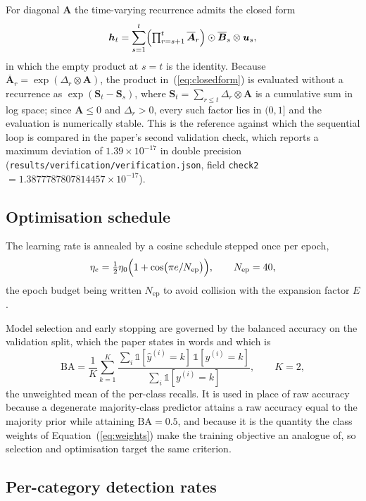 \documentclass[11pt,a4paper]{article}
\newcommand{\Ind}{\mathbb{1}}
\newcommand{\vh}{\bm{h}}
\newcommand{\vu}{\bm{u}}
\newcommand{\mA}{\bm{A}}
\newcommand{\Abar}{\overline{\bm{A}}}
\newcommand{\Bbar}{\overline{\bm{B}}}
\begin{document}
For diagonal $\mA$ the time-varying recurrence admits the closed form
\begin{equation}
\vh_{t}=\sum_{s=1}^{t}
\Bigl(\textstyle\prod_{r=s+1}^{t}\Abar_{r}\Bigr)
\odot\Bbar_{s}\otimes\vu_{s},
\label{eq:closedform}
\end{equation}
in which the empty product at $s=t$ is the identity. Because
$\Abar_{r}=\exp(\Delta_{r}\otimes\mA)$, the product
in~(\ref{eq:closedform}) is evaluated without a recurrence as
$\exp(\bm{S}_{t}-\bm{S}_{s})$, where
$\bm{S}_{t}=\sum_{r\le t}\Delta_{r}\otimes\mA$ is a cumulative sum in
log space; since $\mA\le 0$ and $\Delta_{r}>0$, every such factor lies
in $(0,1]$ and the evaluation is numerically stable. This is the
reference against which the sequential loop is compared in the paper's
second validation check, which reports a maximum deviation of
$1.39\times10^{-17}$ in double precision
(\texttt{results/verification/verification.json}, field
\texttt{check2}~$=1.3877787807814457\times10^{-17}$).

\subsection{Optimisation schedule}

The learning rate is annealed by a cosine schedule stepped once per
epoch,
\begin{equation}
\eta_{e}=\tfrac{1}{2}\eta_{0}
\Bigl(1+\cos\bigl(\pi e/N_{\mathrm{ep}}\bigr)\Bigr),
\qquad N_{\mathrm{ep}}=40,
\label{eq:cosine}
\end{equation}
the epoch budget being written $N_{\mathrm{ep}}$ to avoid collision
with the expansion factor $E$.

Model selection and early stopping are governed by the balanced
accuracy on the validation split, which the paper states in words and
which is
\begin{equation}
\mathrm{BA}=\frac{1}{K}\sum_{k=1}^{K}
\frac{\sum_{i}\Ind[\hat{y}^{(i)}=k]\,\Ind[y^{(i)}=k]}
{\sum_{i}\Ind[y^{(i)}=k]},
\qquad K=2,
\label{eq:balacc}
\end{equation}
the unweighted mean of the per-class recalls. It is used in place of
raw accuracy because a degenerate majority-class predictor attains a
raw accuracy equal to the majority prior while attaining
$\mathrm{BA}=0.5$, and because it is the quantity the class weights of
Equation~(\ref{eq:weights}) make the training objective an analogue of,
so selection and optimisation target the same criterion.

\subsection{Per-category detection rates}
\end{document}
